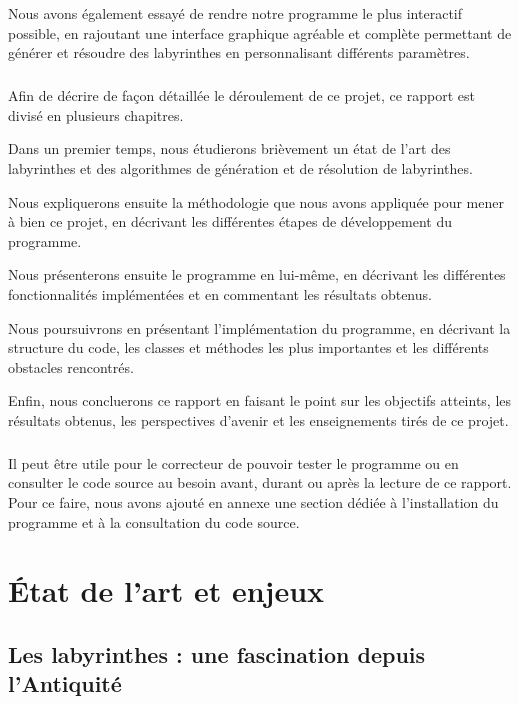 \documentclass[12pt]{scrreprt} %
\begin{document}
Nous avons également essayé de rendre notre programme le plus interactif possible, en rajoutant une interface graphique agréable et complète permettant de générer et résoudre des labyrinthes en personnalisant différents paramètres.

\paragraph{}

Afin de décrire de façon détaillée le déroulement de ce projet, ce rapport est divisé en plusieurs chapitres.

Dans un premier temps, nous étudierons brièvement un état de l'art des labyrinthes et des algorithmes de génération et de résolution de labyrinthes.

Nous expliquerons ensuite la méthodologie que nous avons appliquée pour mener à bien ce projet, en décrivant les différentes étapes de développement du programme.

Nous présenterons ensuite le programme en lui-même, en décrivant les différentes fonctionnalités implémentées et en commentant les résultats obtenus.

Nous poursuivrons en présentant l'implémentation du programme, en décrivant la structure du code, les classes et méthodes les plus importantes et les différents obstacles rencontrés.

Enfin, nous concluerons ce rapport en faisant le point sur les objectifs atteints, les résultats obtenus, les perspectives d'avenir et les enseignements tirés de ce projet.

\paragraph{}

Il peut être utile pour le correcteur de pouvoir tester le programme ou en consulter le code source au besoin avant, durant ou après la lecture de ce rapport. Pour ce faire, nous avons ajouté en annexe une section dédiée à l'installation du programme et à la consultation du code source.

\chapter{État de l'art et enjeux}


\section{Les labyrinthes : une fascination depuis l'Antiquité}
\end{document}
